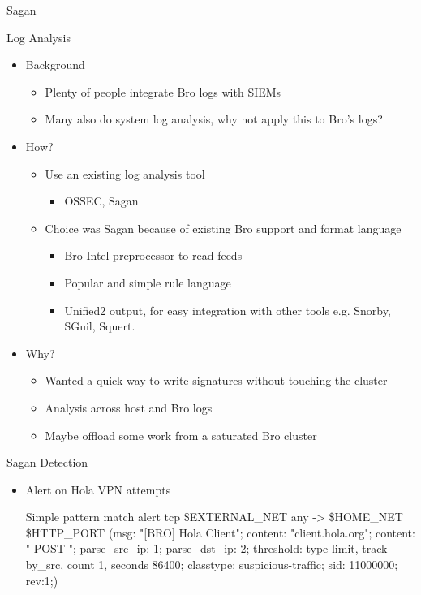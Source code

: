 \documentclass[xcolor=svgnames,handout]{beamer}
\begin{document}
\begin{frame}{Sagan}
  \begin{block}{Log Analysis}
    \begin{itemize}
      \item Background
    	\begin{itemize}
		\item Plenty of people integrate Bro logs with SIEMs
                \item Many also do system log analysis, why not apply this to Bro's logs?
    	\end{itemize}
      \item How?
    	\begin{itemize}
		\item Use an existing log analysis tool
    	        \begin{itemize}
		  \item OSSEC, Sagan
    	        \end{itemize}
		\item Choice was Sagan because of existing Bro support and format language
    	        \begin{itemize}
		  \item Bro Intel preprocessor to read feeds
		  \item Popular and simple rule language
		  \item Unified2 output, for easy integration with other tools e.g. Snorby, SGuil, Squert.
    	        \end{itemize}
    	\end{itemize}
      \item Why?
    	\begin{itemize}
                \item Wanted a quick way to write signatures without touching the cluster
                \item Analysis across host and Bro logs
                \item Maybe offload some work from a saturated Bro cluster
    	\end{itemize}
    \end{itemize}
  \end{block}
\end{frame}

\begin{frame}{Sagan Detection}
  \begin{itemize}
    \item Alert on Hola VPN attempts
    \begin{exampleblock}{Simple pattern match}
        \alert{alert tcp \$EXTERNAL\_NET any -> \$HOME\_NET \$HTTP\_PORT (msg: "[BRO]
          Hola Client"; content: "client.hola.org"; content: " POST ";
          parse\_src\_ip: 1; parse\_dst\_ip: 2; threshold: type limit, track by\_src,
          count 1, seconds 86400; classtype: suspicious-traffic; sid: 11000000;
          rev:1;)}
    \end{exampleblock}
    \end{itemize}
\end{frame}
\end{document}
